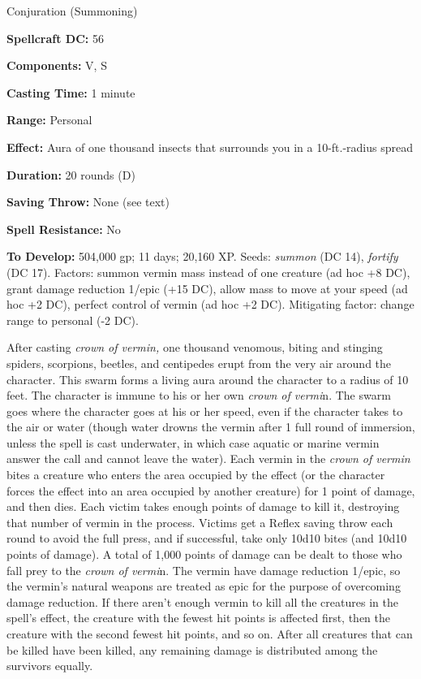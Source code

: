 \documentclass{article}
\begin{document}
Conjuration (Summoning) 

\textbf{Spellcraft DC:} 56 

\textbf{Components:} V, S 

\textbf{Casting Time:} 1 minute 

\textbf{Range:} Personal 

\textbf{Effect:} Aura of one thousand insects that surrounds you in a 10-ft.-radius 
spread 

\textbf{Duration:} 20 rounds (D) 

\textbf{Saving Throw:} None (see text) 

\textbf{Spell Resistance:} No 

\textbf{To Develop:} 504,000 gp; 11 days; 20,160 XP. Seeds: \textit{summon }(DC 
14), \textit{fortify }(DC 17). Factors: summon vermin mass instead of one creature 
(ad hoc +8 DC), grant damage reduction 1/epic (+15 DC), allow mass to move at your 
speed (ad hoc +2 DC), perfect control of vermin (ad hoc +2 DC). Mitigating factor: 
change range to personal (-2 DC). 

After casting \textit{crown of vermin, }one thousand venomous, biting and stinging 
spiders, scorpions, beetles, and centipedes erupt from the very air around the 
character. This swarm forms a living aura around the character to a radius of 10 
feet. The character is immune to his or her own \textit{crown of vermi}n. The swarm 
goes where the character goes at his or her speed, even if the character takes 
to the air or water (though water drowns the vermin after 1 full round of immersion, 
unless the spell is cast underwater, in which case aquatic or marine vermin answer 
the call and cannot leave the water). Each vermin in the \textit{crown of vermin 
}bites a creature who enters the area occupied by the effect (or the character 
forces the effect into an area occupied by another creature) for 1 point of damage, 
and then dies. Each victim takes enough points of damage to kill it, destroying 
that number of vermin in the process. Victims get a Reflex saving throw each round 
to avoid the full press, and if successful, take only 10d10 bites (and 10d10 points 
of damage). A total of 1,000 points of damage can be dealt to those who fall prey 
to the \textit{crown of vermi}n. The vermin have damage reduction 1/epic, so the 
vermin's natural weapons are treated as epic for the purpose of overcoming damage 
reduction. If there aren't enough vermin to kill all the creatures in the spell's 
effect, the creature with the fewest hit points is affected first, then the creature 
with the second fewest hit points, and so on. After all creatures that can be killed 
have been killed, any remaining damage is distributed among the survivors equally. 
\end{document}
